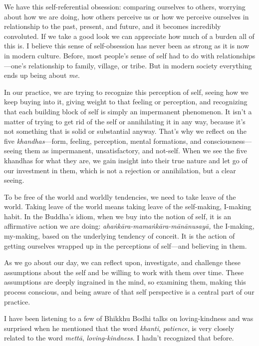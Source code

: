 We have this self-referential obsession: comparing ourselves to others, 
worrying about how we are doing, how others perceive us or how we 
perceive ourselves in relationship to the past, present, and future, 
and it becomes incredibly convoluted. If we take a good look we can 
appreciate how much of a burden all of this is. I believe this sense of 
self-obsession has never been as strong as it is now in modern culture. 
Before, most people's sense of self had to do with 
relationships---one's relationship to family, village, or tribe. But in 
modern society everything ends up being about \emph{me}.

In our practice, we are trying to recognize this perception of self, 
seeing how we keep buying into it, giving weight to that feeling or 
perception, and recognizing that each building block of self is simply 
an impermanent phenomenon. It isn't a matter of trying to get rid of 
the self or annihilating it in any way, because it's not something that 
is solid or substantial anyway. That's why we reflect on the five 
\emph{khandhas}---form, feeling, perception, mental formations, and 
consciousness---seeing them as impermanent, unsatisfactory, and 
not-self. When we see the five khandhas for what they are, we gain 
insight into their true nature and let go of our investment in them, 
which is not a rejection or annihilation, but a clear seeing.

To be free of the world and worldly tendencies, we need to take leave 
of the world. Taking leave of the world means taking leave of the 
self-making, I-making habit. In the Buddha's idiom, when we buy into 
the notion of self, it is an affirmative action we are doing: 
\emph{ahaṅkāra-mamaṅkāra-mānānusayā,} the I-making, my-making, 
based on the underlying tendency of conceit. It is the action of 
getting ourselves wrapped up in the perceptions of self---and believing 
in them.

As we go about our day, we can reflect upon, investigate, and challenge 
these assumptions about the self and be willing to work with them over 
time. These assumptions are deeply ingrained in the mind, so examining 
them, making this process conscious, and being aware of that self 
perspective is a central part of our practice.


I have been listening to a few of Bhikkhu Bodhi talks on 
loving-kindness and was surprised when he mentioned that the word 
\emph{khanti}, \emph{patience}, is very closely related to the word 
\emph{mettā}, \emph{loving-kindness}. I hadn't recognized that before.

